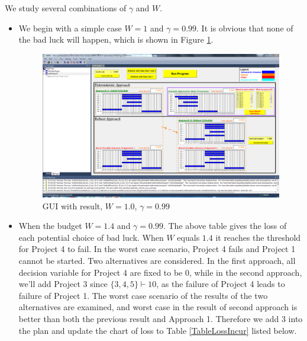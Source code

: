 \documentclass[final,3p,times]{elsarticle}
\begin{document}
We study several combinations of $\gamma$ and $W$. 
\begin{itemize}
	\item We begin with a simple case $W=1$ and $\gamma=0.99$. It is obvious that none of the bad luck will happen, which is shown in Figure \ref{FigData1hp990w1p000}.
	
		\begin{figure}[H]
			\centering
			\includegraphics[trim=95mm 45mm 5mm 25mm, clip, width=14.5cm]{Data1hp990w1p000.png}
			\caption{GUI with result, $W=1.0$, $\gamma=0.99$}
			\label{FigData1hp990w1p000}
		\end{figure}
	
	\item When the budget $W=1.4$ and $\gamma=0.99$. The above table gives the loss of each potential choice of bad luck. When $W$ equals $1.4$ it reaches the threshold for Project 4 to fail. In the worst case scenario, Project 4 fails and Project 1 cannot be started. Two alternatives are considered. In the first approach, all decision variable for Project 4 are fixed to be 0, while in the second approach, we'll add Project 3 since $\{3,4,5\}\vdash 10$, as the failure of Project 4 leads to failure of Project 1. The worst case scenario of the results of the two alternatives are examined, and worst case in the result of second approach is better than both the previous result and Approach 1. Therefore we add 3 into the plan and update the chart of loss to Table \ref{TableLossIncur} listed below.


\end{itemize}
\end{document}
